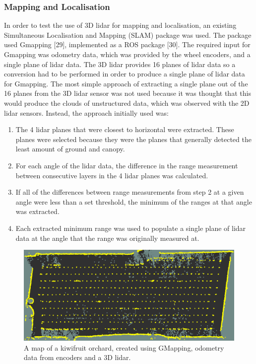 \documentclass[preprint,authoryear,12pt]{elsarticle}
\begin{document}
\subsubsection{Mapping and Localisation}
    In order to test the use of 3D lidar for mapping and localisation, an existing Simultaneous Localisation and Mapping (SLAM) package was used. The package used Gmapping [29]⁠, implemented as a ROS package [30]⁠. The required input for Gmapping was odometry data, which was provided by the wheel encoders, and a single plane of lidar data. The 3D lidar provides 16 planes of lidar data so a conversion had to be performed in order to produce a single plane of lidar data for Gmapping. The most simple approach of extracting a single plane out of the 16 planes from the 3D lidar sensor was not used because it was thought that this would produce the clouds of unstructured data, which was observed with the 2D lidar sensors. Instead, the approach initially used was:
    \begin{enumerate}
    \item The 4 lidar planes that were closest to horizontal were extracted. These planes were selected because they were the planes that generally detected the least amount of ground and canopy.
    \item For each angle of the lidar data, the difference in the range measurement between consecutive layers in the 4 lidar planes was calculated. 
    \item If all of the differences between range measurements from step 2 at a given angle were less than a set threshold, the minimum of the ranges at that angle was extracted.
    \item Each extracted minimum range was used to populate a single plane of lidar data at the angle that the range was originally measured at.
    \end{enumerate}

    \begin{figure}[htb]
        \centering
        \includegraphics[width=\linewidth]{imgs/photos/gmapmap.png}
        \caption{
            A map of a kiwifruit orchard, created using GMapping, odometry data from encoders and a 3D lidar.
        }
        \label{fig:gmapmap}
    \end{figure}
\end{document}
